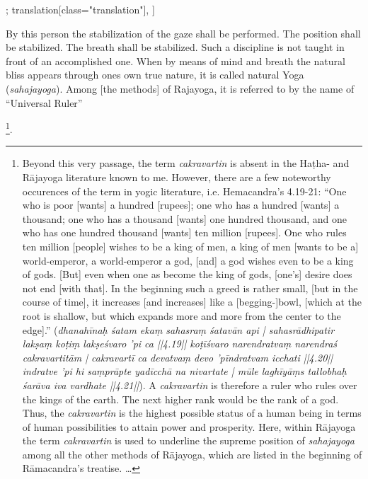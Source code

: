 \begin{alignment}[
  texts=edition[class="edition"];
  translation[class="translation"],
  ]
\begin{translation}
\begin{tlate}[p58_04]
By this person the stabilization of the gaze shall be performed. The position shall be stabilized. The breath shall be stabilized. Such a discipline is not taught in front of an accomplished one. When by means of mind and breath the natural bliss appears through ones own true nature, it is called natural Yoga (\textit{sahajayoga}). Among [the methods] of Rajayoga, it is referred to by the name of ``Universal Ruler''\begin{buber}[f58_2]\footnote{Beyond this very passage, the term \textit{cakravartin} is absent in the Haṭha- and Rājayoga literature known to me. However, there are a few noteworthy occurences of the term in yogic literature, i.e. Hemacandra's  4.19-21: ``One who is poor [wants] a hundred [rupees]; one who has a hundred [wants] a thousand; one who has a thousand [wants] one hundred thousand, and one who has one hundred thousand [wants] ten million [rupees]. One who rules ten million [people] wishes to be a king of men, a king of men [wants to be a] world-emperor, a world-emperor a god, [and] a god wishes even to be a king of gods. [But] even when one as become the king of gods, [one's] desire does not end [with that]. In the beginning such a greed is rather small, [but in the course of time], it increases [and increases] like a [begging-]bowl, [which at the root is shallow, but which expands more and more from the center to the edge].'' (\textit{dhanahīnaḥ śatam ekaṃ sahasraṃ śatavān api | sahasrādhipatir lakṣaṃ koṭiṃ lakṣeśvaro ’pi ca ||4.19|| koṭīśvaro narendratvaṃ narendraś cakravartitām | cakravartī ca devatvaṃ devo ’pīndratvam icchati ||4.20|| indratve ’pi hi saṃprāpte yadīcchā na nivartate | mūle laghīyāṃs tallobhaḥ śarāva iva vardhate ||4.21||}). A \textit{cakravartin} is therefore a ruler who rules over the kings of the earth. The next higher rank would be the rank of a god. Thus, the \textit{cakravartin} is the highest possible status of a human being in terms of human possibilities to attain power and prosperity. Here, within Rājayoga the term \textit{cakravartin} is used to underline the supreme position of \textit{sahajayoga} among all the other methods of Rājayoga, which are listed in the beginning of Rāmacandra's treatise. \ldots}.\end{buber}
\flushpage 
    \end{tlate}
  \end{translation}
\end{alignment}
\pagebreak
